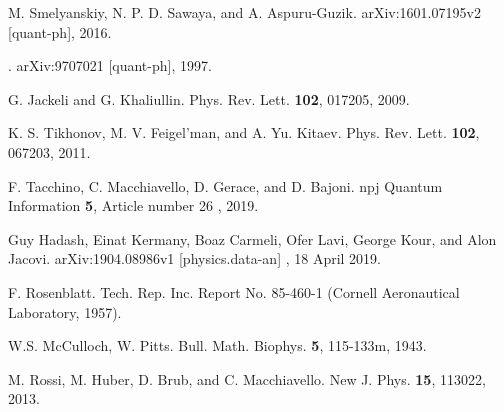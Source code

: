 \documentclass{article}
\begin{document}
\begin{thebibliography}{1}

M. Smelyanskiy, N. P. D. Sawaya, and A. Aspuru-Guzik.
\newblock arXiv:1601.07195v2 [quant-ph], 2016.

.
\newblock arXiv:9707021 [quant-ph], 1997.

G. Jackeli and G. Khaliullin.
\newblock Phys. Rev. Lett. \textbf{102}, 017205, 2009.

K.  S.  Tikhonov,  M.  V.  Feigel’man,  and  A.  Yu.  Kitaev.
\newblock Phys. Rev. Lett. \textbf{102}, 067203, 2011.

F. Tacchino, C. Macchiavello, D. Gerace, and D. Bajoni.
\newblock npj Quantum Information \textbf{5}, Article number 26 , 2019.

Guy Hadash, Einat Kermany, Boaz Carmeli, Ofer Lavi, George Kour, and Alon
  Jacovi.
\newblock  arXiv:1904.08986v1 [physics.data-an] , 18 April 2019.

F. Rosenblatt.
\newblock  Tech. Rep. Inc. Report No. 85-460-1 (Cornell Aeronautical Laboratory, 1957).

W.S. McCulloch, W. Pitts.
\newblock  Bull. Math. Biophys. \textbf{5}, 115-133m, 1943.

M. Rossi, M. Huber, D. Brub, and C. Macchiavello.
\newblock  New J. Phys. \textbf{15}, 113022, 2013.

\end{thebibliography}
\end{document}
